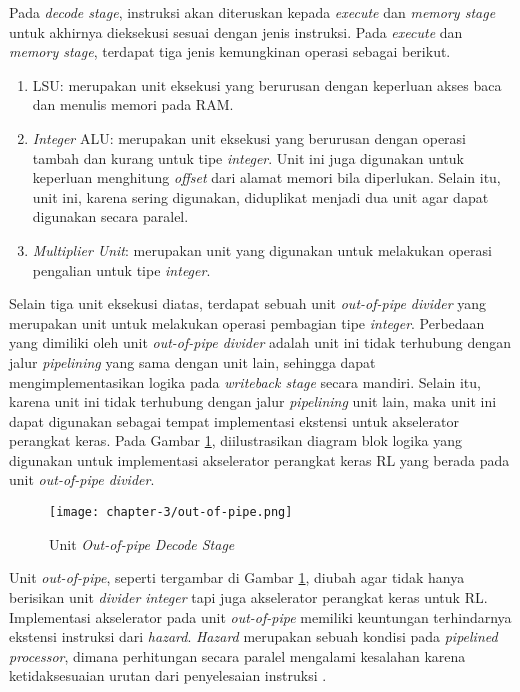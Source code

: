 Pada \textit{decode stage}, instruksi akan diteruskan kepada \textit{execute} dan \textit{memory stage} untuk akhirnya dieksekusi sesuai dengan jenis instruksi. Pada \textit{execute} dan \textit{memory stage}, terdapat tiga jenis kemungkinan operasi sebagai berikut.


\begin{enumerate}
	\item \ac{LSU}: merupakan unit eksekusi yang berurusan dengan keperluan akses baca dan menulis memori pada \ac{RAM}.
	\item \textit{Integer} \ac{ALU}: merupakan unit eksekusi yang berurusan dengan operasi tambah dan kurang untuk tipe \textit{integer}. Unit ini juga digunakan untuk keperluan menghitung \textit{offset} dari alamat memori bila diperlukan. Selain itu, unit ini, karena sering digunakan, diduplikat menjadi dua unit agar dapat digunakan secara paralel.
	\item \textit{Multiplier Unit}: merupakan unit yang digunakan untuk melakukan operasi pengalian untuk tipe \textit{integer}.
\end{enumerate}

Selain tiga unit eksekusi diatas, terdapat sebuah unit \textit{out-of-pipe divider} yang merupakan unit untuk melakukan operasi pembagian tipe \textit{integer}. Perbedaan yang dimiliki oleh unit \textit{out-of-pipe divider} adalah unit ini tidak terhubung dengan jalur \textit{pipelining} yang sama dengan unit lain, sehingga dapat mengimplementasikan logika pada \textit{writeback stage} secara mandiri. Selain itu, karena unit ini tidak terhubung dengan jalur \textit{pipelining} unit lain, maka unit ini dapat digunakan sebagai tempat implementasi ekstensi untuk akselerator perangkat keras. Pada Gambar \ref{fig:out-of-pipe}, diilustrasikan diagram blok logika yang digunakan untuk implementasi akselerator perangkat keras \ac{RL} yang berada pada unit \textit{out-of-pipe divider}.

\begin{figure}[H]
	\centering
	\texttt{[image: chapter-3/out-of-pipe.png]}
	\caption{Unit \textit{Out-of-pipe} \textit{Decode Stage}}
	\label{fig:out-of-pipe}
\end{figure}

Unit \textit{out-of-pipe}, seperti tergambar di Gambar \ref{fig:out-of-pipe}, diubah agar tidak hanya berisikan unit \textit{divider integer} tapi juga akselerator perangkat keras untuk \ac{RL}. Implementasi akselerator pada unit \textit{out-of-pipe} memiliki keuntungan terhindarnya ekstensi instruksi dari \textit{hazard}. \textit{Hazard} merupakan sebuah kondisi pada \textit{pipelined processor}, dimana perhitungan secara paralel mengalami kesalahan karena ketidaksesuaian urutan dari penyelesaian instruksi \parencite{sarah2021digital}.

